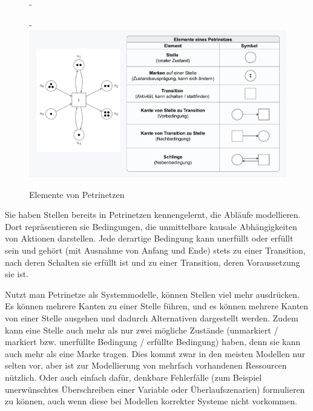 \begin{figure}[!htbp]
	\begin{addmargin*}[0cm]{-\marginparwidth}
	\begin{addmargin*}[0cm]{-\marginparsep}
		\centering
		\includegraphics[width=\linewidth]{Bilder/Kapitel-5/grundelemente_petrinetze.pdf}
		\caption{Elemente von Petrinetzen}
		\label{fig:grundelemente_petrinetze}
	\end{addmargin*}
	\end{addmargin*}
\end{figure}


Sie haben Stellen bereits in Petrinetzen kennengelernt, die Abläufe modellieren. 
Dort repräsentieren sie Bedingungen, die unmittelbare kausale Abhängigkeiten von Aktionen darstellen. Jede derartige Bedingung kann unerfüllt oder erfüllt sein und gehört (mit Ausnahme von Anfang und Ende) stets zu einer Transition, nach deren Schalten sie erfüllt ist und zu einer Transition, deren Voraussetzung sie ist.

Nutzt man Petrinetze als Systemmodelle, können Stellen viel mehr ausdrücken. 
Es können mehrere Kanten zu einer Stelle führen, und es können mehrere Kanten von einer Stelle ausgehen und dadurch Alternativen dargestellt werden. Zudem kann eine Stelle auch mehr als nur zwei mögliche Zustände (unmarkiert / markiert bzw. unerfüllte Bedingung / erfüllte Bedingung) haben, denn sie kann auch mehr als eine Marke tragen. Dies kommt zwar in den meisten Modellen nur selten vor, aber ist zur Modellierung von mehrfach vorhandenen Ressourcen nützlich. Oder auch einfach dafür, denkbare Fehlerfälle (zum Beispiel unerwünschtes Überschreiben einer Variable oder Überlaufszenarien) formulieren zu können, auch wenn diese bei Modellen korrekter Systeme nicht vorkommen.


